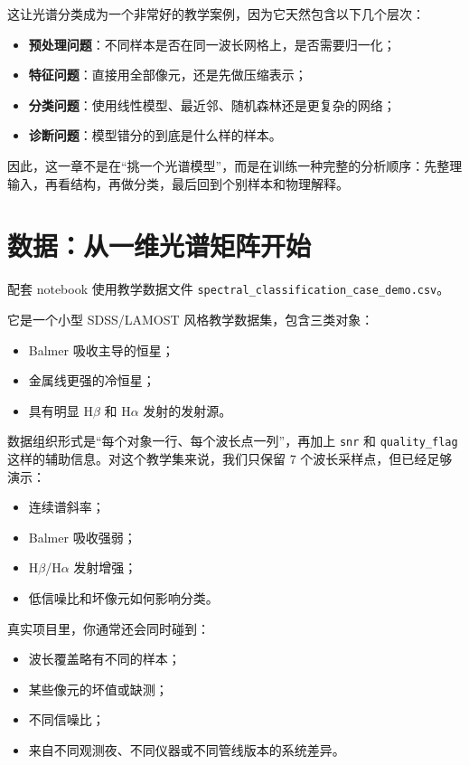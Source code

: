 这让光谱分类成为一个非常好的教学案例，因为它天然包含以下几个层次：

\begin{itemize}
    \item \textbf{预处理问题}：不同样本是否在同一波长网格上，是否需要归一化；
    \item \textbf{特征问题}：直接用全部像元，还是先做压缩表示；
    \item \textbf{分类问题}：使用线性模型、最近邻、随机森林还是更复杂的网络；
    \item \textbf{诊断问题}：模型错分的到底是什么样的样本。
\end{itemize}

因此，这一章不是在“挑一个光谱模型”，而是在训练一种完整的分析顺序：先整理输入，再看结构，再做分类，最后回到个别样本和物理解释。

\section{数据：从一维光谱矩阵开始}

配套 notebook 使用教学数据文件 \texttt{spectral\_classification\_case\_demo.csv}。

它是一个小型 SDSS/LAMOST 风格教学数据集，包含三类对象：

\begin{itemize}
    \item Balmer 吸收主导的恒星；
    \item 金属线更强的冷恒星；
    \item 具有明显 H$\beta$ 和 H$\alpha$ 发射的发射源。
\end{itemize}

数据组织形式是“每个对象一行、每个波长点一列”，再加上 \texttt{snr} 和 \texttt{quality\_flag} 这样的辅助信息。对这个教学集来说，我们只保留 7 个波长采样点，但已经足够演示：

\begin{itemize}
    \item 连续谱斜率；
    \item Balmer 吸收强弱；
    \item H$\beta$/H$\alpha$ 发射增强；
    \item 低信噪比和坏像元如何影响分类。
\end{itemize}

真实项目里，你通常还会同时碰到：

\begin{itemize}
    \item 波长覆盖略有不同的样本；
    \item 某些像元的坏值或缺测；
    \item 不同信噪比；
    \item 来自不同观测夜、不同仪器或不同管线版本的系统差异。
\end{itemize}


